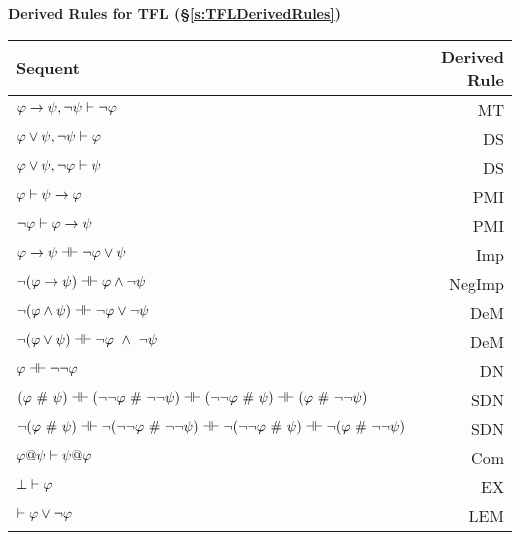 \vspace{1em}
\begin{center}
\textbf{\Large Derived Rules for TFL (\S \ref{s:TFLDerivedRules})}
\end{center}


\begin{center}
\begin{tabular}{l  r}
\textbf{Sequent}                    &       \textbf{Derived Rule} \\ \hline
$\mathcal{\varphi} \rightarrow \mathcal{\psi},  \neg\mathcal{\psi} \vdash \neg \mathcal{\varphi}$   &                       MT  \\
$\mathcal{\varphi} \vee \mathcal{\psi},  \neg\mathcal{\psi} \vdash \mathcal{\varphi}$ & DS\\
$\mathcal{\varphi} \vee \mathcal{\psi},  \neg\mathcal{\varphi}\vdash \mathcal{\psi}$    &      DS  \\
$\mathcal{\varphi} \vdash\mathcal{\psi} \rightarrow \mathcal{\varphi}$  &              PMI  \\
$\neg\mathcal{\varphi}\vdash\mathcal{\varphi}\rightarrow \mathcal{\psi}$  & PMI\\
$\meta{\varphi} \rightarrow\meta{\psi} \pequiv \enot\meta{\varphi}\eor \meta{\psi}$  &                   Imp   \\
$\enot (\meta{\varphi} \rightarrow \meta{\psi}) \pequiv \meta{\varphi} \eand \enot \meta{\psi}$  &               NegImp  \\
$\enot (\meta{\varphi} \eand \meta{\psi})  \pequiv \enot\meta{\varphi}\eor \enot \meta{\psi}$  &                DeM  \\
$\enot (\meta{\varphi} \eor \meta{\psi}) \pequiv \enot\meta{\varphi}\ \eand \ \enot \meta{\psi}$   &               DeM  \\
$\meta{\varphi} \pequiv \enot \enot \meta{\varphi}$     &                              DN  \\
$(\meta{\varphi}  \ \#\  \meta{\psi}) \pequiv (\enot \enot \meta{\varphi}  \ \#\   \enot \enot \meta{\psi}) \pequiv (\enot \enot \meta{\varphi}  \ \#\  \meta{\psi}) \pequiv (\meta{\varphi}  \ \#\  \enot \enot  \meta{\psi})$ & SDN\\
$\enot (\meta{\varphi}  \ \#\  \meta{\psi}) \pequiv \enot (\enot \enot \meta{\varphi}  \ \#\   \enot \enot \meta{\psi}) \pequiv \enot (\enot \enot \meta{\varphi}  \ \#\  \meta{\psi}) \pequiv \enot (\meta{\varphi}  \ \#\  \enot \enot  \meta{\psi})$ & SDN\\
$\mathcal{\varphi} @ \mathcal{\psi}  \vdash  \mathcal{\psi} @ \mathcal{\varphi}$ &                          Com \\
$\bot \vdash \mathcal{\varphi}$ & EX \\
 $\vdash \mathcal{\varphi}\vee \neg \mathcal{\varphi}$ &                                                    LEM \\
\end{tabular}
\end{center}


